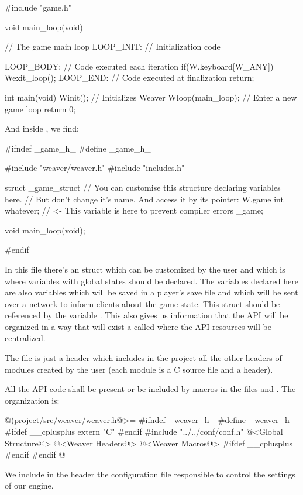 \linha
\alinhaverbatim
#include "game.h"

void main_loop(void){ // The game main loop
 LOOP_INIT: // Initialization code 

 LOOP_BODY: // Code executed each iteration
    if(W.keyboard[W_ANY])
        Wexit_loop();
 LOOP_END: // Code executed at finalization
    return;
}

int main(void){
  Winit(); // Initializes Weaver
  Wloop(main_loop); // Enter a new game loop
  return 0;
}
\alinhanormal
\linha

And inside , we find:

\linha
\alinhaverbatim
#ifndef _game_h_
#define _game_h_

#include "weaver/weaver.h"
#include "includes.h"

struct _game_struct{
  // You can customise this structure declaring variables here.
  // But don't change it's name. And access it by its pointer: W.game
  int whatever; // <- This variable is here to prevent compiler errors
} _game;

void main_loop(void);

#endif
\alinhanormal
\linha

In this file there's an struct which can be customized by the user and
which is where variables with global states should be declared. The
variables declared here are also variables which will be saved in a
player's save file and which will be sent over a network to inform
clients about the game state. This struct should be referenced by the
variable . This also gives us information that the
API will be organized in a way that will exist a 
called  where the API resources will be centralized.

The file  is just a header which includes in
the project all the other headers of modules created by the user (each
module is a C source file and a header).

All the API code shall be present or be included by macros in the
files  and . The
 organization is:

\iniciocodigo
@(project/src/weaver/weaver.h@>=
#ifndef _weaver_h_
#define _weaver_h_
#ifdef __cplusplus
  extern "C" {
#endif
#include "../../conf/conf.h"
@<Global Structure@>
@<Weaver Headers@>
@<Weaver Macros@>
#ifdef __cplusplus
  }
#endif
#endif
@
\fimcodigo

We include in the header the configuration file 
responsible to control the settings of our engine.

